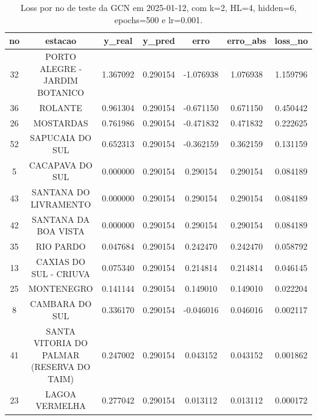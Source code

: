 \begin{table}[h]
\centering
\caption{Loss por no de teste da GCN em 2025-01-12, com k=2, HL=4, hidden=6, epochs=500 e lr=0.001.}
\label{tab:gcn_loss_k2_hl4_h6_e500_d20250112}
\begin{tabular}{ccccccc}
\toprule
no & estacao & y\_real & y\_pred & erro & erro\_abs & loss\_no \\
\midrule
32 & PORTO ALEGRE - JARDIM BOTANICO & 1.367092 & 0.290154 & -1.076938 & 1.076938 & 1.159796 \\
36 & ROLANTE & 0.961304 & 0.290154 & -0.671150 & 0.671150 & 0.450442 \\
26 & MOSTARDAS & 0.761986 & 0.290154 & -0.471832 & 0.471832 & 0.222625 \\
52 & SAPUCAIA DO SUL & 0.652313 & 0.290154 & -0.362159 & 0.362159 & 0.131159 \\
5 & CACAPAVA DO SUL & 0.000000 & 0.290154 & 0.290154 & 0.290154 & 0.084189 \\
43 & SANTANA DO LIVRAMENTO & 0.000000 & 0.290154 & 0.290154 & 0.290154 & 0.084189 \\
42 & SANTANA DA BOA VISTA & 0.000000 & 0.290154 & 0.290154 & 0.290154 & 0.084189 \\
35 & RIO PARDO & 0.047684 & 0.290154 & 0.242470 & 0.242470 & 0.058792 \\
13 & CAXIAS DO SUL - CRIUVA & 0.075340 & 0.290154 & 0.214814 & 0.214814 & 0.046145 \\
25 & MONTENEGRO & 0.141144 & 0.290154 & 0.149010 & 0.149010 & 0.022204 \\
8 & CAMBARA DO SUL & 0.336170 & 0.290154 & -0.046016 & 0.046016 & 0.002117 \\
41 & SANTA VITORIA DO PALMAR (RESERVA DO TAIM) & 0.247002 & 0.290154 & 0.043152 & 0.043152 & 0.001862 \\
23 & LAGOA VERMELHA & 0.277042 & 0.290154 & 0.013112 & 0.013112 & 0.000172 \\
\bottomrule
\end{tabular}
\end{table}
